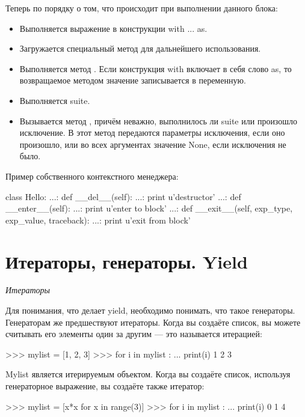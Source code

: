 	Теперь по порядку о том, что происходит при выполнении данного блока:
	\begin{itemize}
		\item Выполняется выражение в конструкции with ... as.
		\item Загружается специальный метод  для дальнейшего использования.
		\item Выполняется метод . Если конструкция with включает в себя слово as, то возвращаемое методом  значение записывается в переменную.
		\item Выполняется suite.
		\item Вызывается метод , причём неважно, выполнилось ли suite или произошло исключение. В этот метод передаются параметры исключения, если оно произошло, или во всех аргументах значение None, если исключения не было.
	\end{itemize}
	
	Пример собственного контекстного менеджера:
	\begin{python}
			class Hello:
	   ...:     def __del__(self):
	   ...:         print u'destructor'
	   ...:     def __enter__(self):
	   ...:         print u'enter to block'
	   ...:     def __exit__(self, exp_type, exp_value, traceback):
	   ...:         print u'exit from block'
	\end{python}
	
\section{Итераторы, генераторы. Yield}

\textit{Итераторы}

Для понимания, что делает yield, необходимо понимать, что такое генераторы. Генераторам же предшествуют итераторы. Когда вы создаёте список, вы можете считывать его элементы один за другим — это называется итерацией:

\begin{python}
>>> mylist = [1, 2, 3]
>>> for i in mylist :
...    print(i)
1
2
3
\end{python}

Mylist является итерируемым объектом. Когда вы создаёте список, используя генераторное выражение, вы создаёте также итератор:

\begin{python}
>>> mylist = [x*x for x in range(3)]
>>> for i in mylist :
...    print(i)
0
1
4
\end{python}

